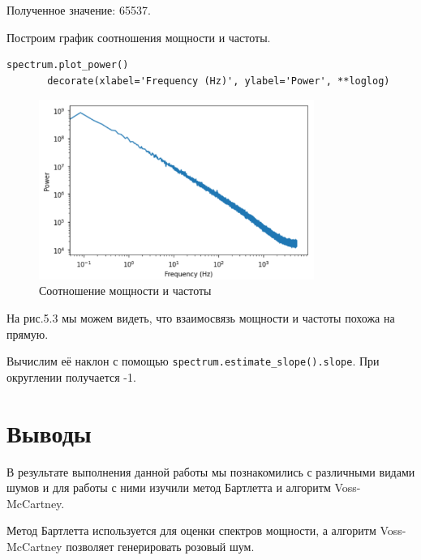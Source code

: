 \documentclass[a4paper,12pt]{report}
\begin{document}
    Полученное значение: 65537.
    
    Построим график соотношения мощности и частоты.
\begin{lstlisting}[caption=Построение соотношения мощности и частоты]
       spectrum.plot_power()
       decorate(xlabel='Frequency (Hz)', ylabel='Power', **loglog)
\end{lstlisting}
\begin{figure}[H]
        \centering
        \includegraphics[width=0.8\textwidth]{fig5-3.PNG}
        \caption{Соотношение мощности и частоты}
        \label{fig:fig5-3}
\end{figure} 

    На рис.5.3 мы можем видеть, что взаимосвязь мощности и частоты похожа на прямую.
    
    Вычислим её наклон с помощью \texttt{spectrum.estimate\_slope().slope}. При округлении получается -1.

\chapter{Выводы}
    В результате выполнения данной работы мы познакомились с различными видами шумов и для работы с ними изучили метод Бартлетта и алгоритм Voss-McCartney.
    
    Метод Бартлетта используется для оценки спектров мощности, а алгоритм Voss-McCartney позволяет генерировать розовый шум.
\end{document}
